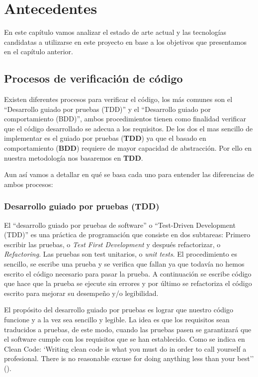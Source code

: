 \chapter{Antecedentes}

En este capítulo vamos analizar el estado de arte actual y las tecnologías candidatas a utilizarse en este proyecto en base a los objetivos que presentamos en el capítulo anterior.


\section {Procesos de verificación de código}

Existen diferentes procesos para verificar el código, los más comunes son el ``Desarrollo guiado por pruebas (TDD)'' y el ``Desarrollo guiado por comportamiento (BDD)'', ambos procedimientos tienen como finalidad verificar que el código desarrollado se adecua a los requisitos. De los dos el mas sencillo de implementar es el guiado por pruebas (\textbf{TDD}) ya que el basado en comportamiento (\textbf{BDD}) requiere de mayor capacidad de abstracción. Por ello en nuestra metodología nos basaremos en \textbf{TDD}.

\bigskip
Aun así vamos a detallar en qué se basa cada uno para entender las diferencias de ambos procesos:

\subsection {Desarrollo guiado por pruebas (TDD)}

El ``desarrollo guiado por pruebas de software'' o ``Test-Driven Development (TDD)'' es una práctica de programación que consiste en dos subtareas: Primero escribir las pruebas, o \textit{Test First Development} y después refactorizar, o \textit{Refactoring}. Las pruebas son test unitarios, o \textit{unit tests}. El procedimiento es sencillo, se escribe una prueba y se verifica que fallan ya que todavía no hemos escrito el código necesario para pasar la prueba. A continuación se escribe código que hace que la prueba se ejecute sin errores y por último se refactoriza el código escrito para mejorar su desempeño y/o legibilidad.

\bigskip
El propósito del desarrollo guiado por pruebas es lograr que nuestro código funcione y a la vez sea sencillo y legible. La idea es que los requisitos sean traducidos a pruebas, de este modo, cuando las pruebas pasen se garantizará que el software cumple con los requisitos que se han establecido. Como se indica en Clean Code: `Writing clean code is what you must do in order to call yourself a profesional. There is no reasonable excuse for doing anything less than your best'' (\cite{martin_clean_2009}).

